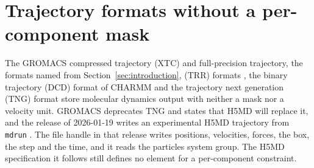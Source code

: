 \section{Trajectory formats without a per-component mask}\label{sec:supp-formats}
The GROMACS compressed trajectory (XTC) and full-precision trajectory, the formats named from Section~\ref{sec:introduction},
(TRR) formats \cite{abrahamGromacsHighPerformance2015}, the binary
trajectory (DCD) format of CHARMM
\cite{brooksCharmmBiomolecularSimulation2009} and the trajectory next
generation (TNG) format
\cite{spangbergTrajectoryNgPortable2011,lundborgEfficientExtensibleFormat2014}
store molecular dynamics output with neither a mask nor a velocity unit.
GROMACS deprecates TNG and states that H5MD will replace it, and the
release of 2026-01-19 writes an experimental H5MD trajectory from
\texttt{mdrun} \cite{gromacsManual2026}.
The file handle in that release writes positions, velocities, forces,
the box, the step and the time, and it reads the particles system group.
The H5MD specification it follows still defines no element for a
per-component constraint.

